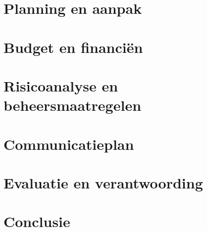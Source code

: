 \documentclass{BK5}
\begin{document}
	\section{Planning en aanpak}
	
	\section{Budget en financiën}
	
	\section{Risicoanalyse en beheersmaatregelen}
	
	\section{Communicatieplan}
	
	\section{Evaluatie en verantwoording}
	
	\section{Conclusie}
	
\end{document}
